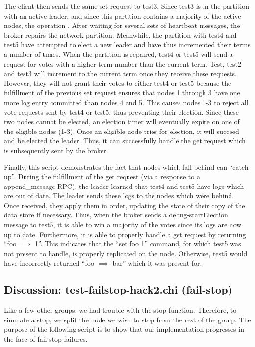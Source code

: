 \documentclass{article}
\begin{document}
The client then sends the same set request to test3. Since test3 is in the partition with an active leader, and since this partition contains a majority of the active nodes, the operation . After waiting for several sets of heartbeat messages, the broker repairs the network partition. Meanwhile, the partition with test4 and test5 have attempted to elect a new leader and have thus incremented their terms a number of times. When the partition is repaired, test4 or test5 will send a request for votes with a higher term number than the current term. Test, test2 and test3 will increment to the current term once they receive these requests. However, they will not grant their votes to either test4 or test5 because the fulfillment of the previous set request ensures that nodes 1 through 3 have one more log entry committed than nodes 4 and 5. This causes nodes 1-3 to reject all vote requests sent by test4 or test5, thus preventing their election. Since these two nodes cannot be elected, an election timer will eventually expire on one of the eligible nodes (1-3). Once an eligible node tries for election, it will succeed and be elected the leader. Thus, it can successfully handle the get request which is subsequently sent by the broker.

Finally, this script demonstrates the fact that nodes which fall behind can “catch up”. During the fulfillment of the get request (via a response to a append\_message RPC), the leader learned that test4 and test5 have logs which are out of date. The leader sends these logs to the nodes which were behind. Once received, they apply them in order, updating the state of their copy of the data store if necessary. Thus, when the broker sends a debug-startElection message to test5, it is able to win a majority of the votes since its logs are now up to date. Furthermore, it is able to properly handle a get request by returning “foo $\implies$ 1”. This indicates that the “set foo 1” command, for which test5 was not present to handle, is properly replicated on the node. Otherwise, test5 would have incorrectly returned “foo $\implies$ bar” which it was present for.

\newpage

\subsection{Discussion: test-failstop-hack2.chi (fail-stop)}
Like a few other groups, we had trouble with the stop function. Therefore, to simulate a stop, we split the node we wish to stop from the rest of the group. The purpose of the following script is to show that our implementation progresses in the face of fail-stop failures.
\end{document}
